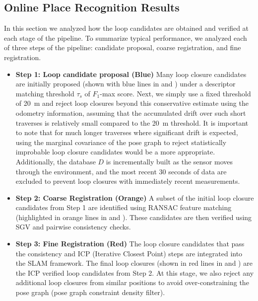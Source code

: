 \subsection*{Online Place Recognition Results}
In this section we analyzed how the loop candidates are obtained and verified at each stage of the pipeline. To summarize typical performance, we analyzed each of three steps of the pipeline: candidate proposal, coarse registration, and fine registration. 
\begin{itemize}
  \item \textbf{Step 1: Loop candidate proposal (Blue)}\hspace{0.5em} Many loop closure candidates are initially proposed (shown with blue lines in  and ) under a descriptor matching threshold $\tau_{s}$ of $F_{1}$-max score. Next, we simply use a fixed threshold of \SI{20}{\meter} and reject loop closures beyond this conservative estimate using the odometry information, assuming that the accumulated drift over such short traverses is relatively small compared to the \SI{20}{\meter} threshold. It is important to note that for much longer traverses where significant drift is expected, using the marginal covariance of the pose graph to reject statistically improbable loop closure candidates would be a more appropriate. Additionally, the database $D$ is incrementally built as the sensor moves through the environment, and the most recent 30 seconds of data are excluded to prevent loop closures with immediately recent measurements.
  
  \item \textbf{Step 2: Coarse Registration (Orange)}\hspace{0.5em} A subset of the initial loop closure candidates from Step 1 are identified using RANSAC feature matching (highlighted in orange lines in  and ). These candidates are then verified using SGV and pairwise consistency checks. 

  \item \textbf{Step 3: Fine Registration (Red)}\hspace{0.5em} The loop closure candidates that pass the consistency and ICP (Iterative Closest Point) steps are integrated into the SLAM framework. The final loop closures (shown in red lines in  and ) are the ICP verified loop candidates from Step 2. At this stage, we also reject any additional loop closures from similar positions to avoid over-constraining the pose graph (pose graph constraint density filter).
\end{itemize}
